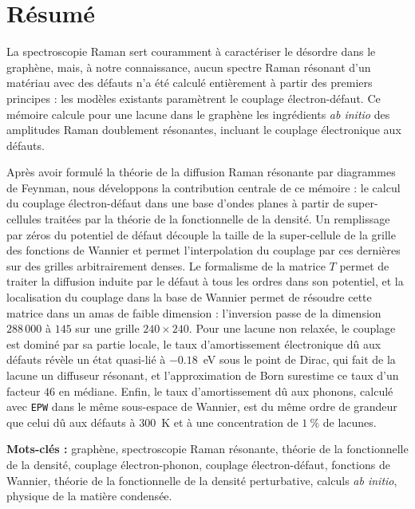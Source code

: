 
\francais
\chapter*{Résumé}

La spectroscopie Raman sert couramment à caractériser le désordre dans le graphène, mais, à notre connaissance, aucun spectre Raman résonant d'un matériau avec des défauts n'a été calculé entièrement à partir des premiers principes : les modèles existants paramètrent le couplage électron-défaut. Ce mémoire calcule pour une lacune dans le graphène les ingrédients \textit{ab initio} des amplitudes Raman doublement résonantes, incluant le couplage électronique aux défauts.

Après avoir formulé la théorie de la diffusion Raman résonante par diagrammes de Feynman, nous développons la contribution centrale de ce mémoire : le calcul du couplage électron-défaut dans une base d'ondes planes à partir de super-cellules traitées par la théorie de la fonctionnelle de la densité. Un remplissage par zéros du potentiel de défaut découple la taille de la super-cellule de la grille des fonctions de Wannier et permet l'interpolation du couplage par ces dernières sur des grilles arbitrairement denses. Le formalisme de la matrice $T$ permet de traiter la diffusion induite par le défaut à tous les ordres dans son potentiel, et la localisation du couplage dans la base de Wannier permet de résoudre cette matrice dans un amas de faible dimension : l'inversion passe de la dimension $288\,000$ à $145$ sur une grille $240\times 240$. Pour une lacune non relaxée, le couplage est dominé par sa partie locale, le taux d'amortissement électronique dû aux défauts révèle un état quasi-lié à $-0.18$~eV sous le point de Dirac, qui fait de la lacune un diffuseur résonant, et l'approximation de Born surestime ce taux d'un facteur $46$ en médiane. Enfin, le taux d'amortissement dû aux phonons, calculé avec \texttt{EPW} dans le même sous-espace de Wannier, est du même ordre de grandeur que celui dû aux défauts à $300$~K et à une concentration de $1~\%$ de lacunes.

\bigskip
{\bf Mots-cl\'es :} graphène, spectroscopie Raman résonante, théorie de la fonctionnelle de la densité, couplage électron-phonon, couplage électron-défaut, fonctions de Wannier, théorie de la fonctionnelle de la densité perturbative, calculs \textit{ab initio}, physique de la matière condensée.